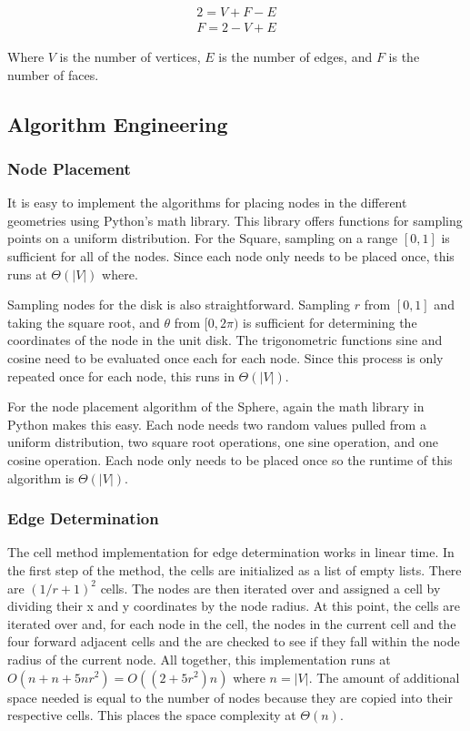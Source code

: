 \documentclass{article}
\begin{document}
        \begin{align}
            2 = V + F - E \\
            F = 2 - V + E
        \end{align}

        Where $V$ is the number of vertices, $E$ is the number of edges, and $F$ is the number of faces.

    \subsection{Algorithm Engineering}

        \subsubsection{Node Placement}
        It is easy to implement the algorithms for placing nodes in the different geometries using Python's math library. This library offers functions for sampling points on a uniform distribution. For the Square, sampling on a range $[0,1]$ is sufficient for all of the nodes. Since each node only needs to be placed once, this runs at $\Theta(|V|)$ where.
        \par
        Sampling nodes for the disk is also straightforward. Sampling $r$ from $[0,1]$ and taking the square root, and $\theta$ from $[0,2\pi)$ is sufficient for determining the coordinates of the node in the unit disk. The trigonometric functions sine and cosine need to be evaluated once each for each node. Since this process is only repeated once for each node, this runs in $\Theta(|V|)$.
        \par
        For the node placement algorithm of the Sphere, again the math library in Python makes this easy. Each node needs two random values pulled from a uniform distribution, two square root operations, one sine operation, and one cosine operation. Each node only needs to be placed once so the runtime of this algorithm is $\Theta(|V|)$.

        \subsubsection{Edge Determination}
        The cell method implementation for edge determination works in linear time. In the first step of the method, the cells are initialized as a list of empty lists. There are $(1/r + 1)^2$ cells. The nodes are then iterated over and assigned a cell by dividing their x and y coordinates by the node radius. At this point, the cells are iterated over and, for each node in the cell, the nodes in the current cell and the four forward adjacent cells and the are checked to see if they fall within the node radius of the current node. All together, this implementation runs at $O\left(n + n + 5nr^2\right) = O\left((2 + 5r^2)n\right)$ where $n = |V|$. The amount of additional space needed is equal to the number of nodes because they are copied into their respective cells. This places the space complexity at $\Theta(n)$.
\end{document}
